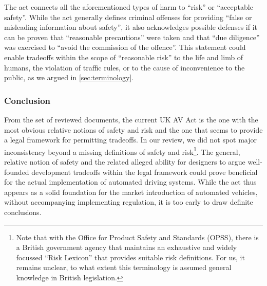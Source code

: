 The act connects all the aforementioned types of harm to ``risk'' or ``acceptable safety''.
While the act generally defines criminal offenses for providing ``false or misleading information about safety'', it also acknowledges possible defenses if it can be proven that ``reasonable precautions'' were taken and that ``due diligence'' was exercised to ``avoid the commission of the offence''.
This statement could enable tradeoffs within the scope of ``reasonable risk'' to the life and limb of humans, the violation of traffic rules, or to the cause of inconvenience to the public, as we argued in \cref{sec:terminology}.

\subsubsection{Conclusion}
From the set of reviewed documents, the current UK AV Act is the one with the most obvious relative notions of safety and risk and the one that seems to provide a legal framework for permitting tradeoffs.
In our review, we did not spot major inconsistency beyond a missing definitions of safety and risk\footnote{Note that with the Office for Product Safety and Standards (OPSS), there is a British government agency that maintains an exhaustive and widely focussed ``Risk Lexicon'' that provides suitable risk definitions. For us, it remains unclear, to what extent this terminology is assumed general knowledge in British legislation.}.
The general, relative notion of safety and the related alleged ability for designers to argue well-founded development tradeoffs within the legal framework could prove beneficial for the actual implementation of automated driving systems.
While the act thus appears as a solid foundation for the market introduction of automated vehicles, without accompanying implementing regulation, it is too early to draw definite conclusions.